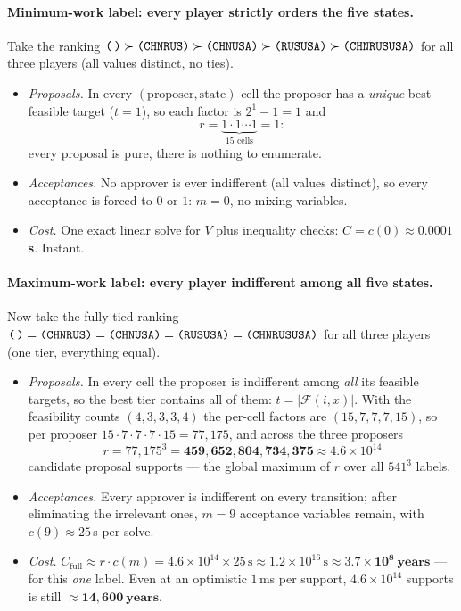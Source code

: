 \documentclass[11pt]{article}
\newcommand{\state}[1]{\texttt{(#1)}}
\newcommand{\empt}{\texttt{(\,)}}
\begin{document}
\paragraph{Minimum-work label: every player strictly orders the five states.} Take the
ranking $\empt\succ\state{CHNRUS}\succ\state{CHNUSA}\succ\state{RUSUSA}\succ
\state{CHNRUSUSA}$ for all three players (all values distinct, no ties).
\begin{itemize}[nosep]
\item \emph{Proposals.} In every $(\text{proposer},\text{state})$ cell the proposer has
a \emph{unique} best feasible target ($t=1$), so each factor is $2^1-1=1$ and
\[
r=\underbrace{1\cdot1\cdots1}_{15\text{ cells}}=1 :
\]
every proposal is pure, there is nothing to enumerate.
\item \emph{Acceptances.} No approver is ever indifferent (all values distinct), so
every acceptance is forced to $0$ or $1$: $m=0$, no mixing variables.
\item \emph{Cost.} One exact linear solve for $V$ plus inequality checks:
$C=c(0)\approx\mathbf{0.0001}$\,\textbf{s}. Instant.
\end{itemize}

\paragraph{Maximum-work label: every player indifferent among all five states.} Now
take the fully-tied ranking $\empt=\state{CHNRUS}=\state{CHNUSA}=\state{RUSUSA}=
\state{CHNRUSUSA}$ for all three players (one tier, everything equal).
\begin{itemize}[nosep]
\item \emph{Proposals.} In every cell the proposer is indifferent among \emph{all} its
feasible targets, so the best tier contains all of them: $t=|\mathcal F(i,x)|$. With
the feasibility counts $(4,3,3,3,4)$ the per-cell factors are $(15,7,7,7,15)$, so per
proposer $15\cdot7\cdot7\cdot7\cdot15=77{,}175$, and across the three proposers
\[
r=77{,}175^{3}=\mathbf{459{,}652{,}804{,}734{,}375}\approx4.6\times10^{14}
\]
candidate proposal supports --- the global maximum of $r$ over all $541^3$ labels.
\item \emph{Acceptances.} Every approver is indifferent on every transition; after
eliminating the irrelevant ones, $m=9$ acceptance variables remain, with
$c(9)\approx25$\,s per solve.
\item \emph{Cost.} $C_{\text{full}}\approx r\cdot c(m)=4.6\times10^{14}\times25\,\text{s}
\approx1.2\times10^{16}\,\text{s}\approx\mathbf{3.7\times10^{8}\ \textbf{years}}$ --- for
this \emph{one} label. Even at an optimistic $1$\,ms per support, $4.6\times10^{14}$
supports is still $\approx\mathbf{14{,}600\ \textbf{years}}$.
\end{itemize}
\end{document}
